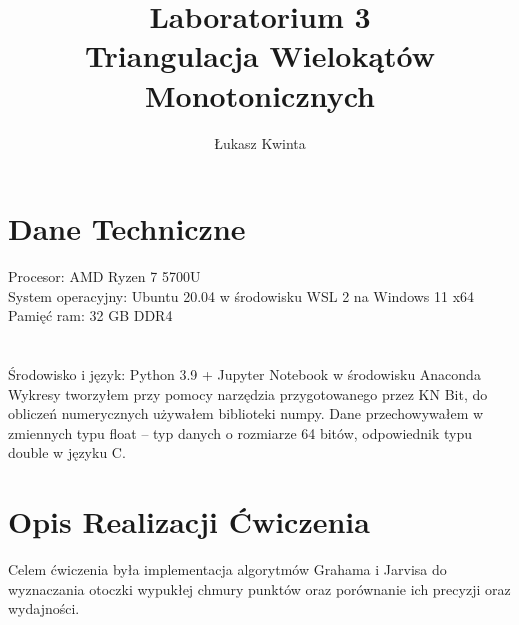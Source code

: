 \documentclass[a4paper]{article}
\title{\fontsize{30pt}{30pt}\selectfont Laboratorium 3 \\ Triangulacja Wielokątów Monotonicznych}
\author{\fontsize{20pt}{20pt}\selectfont Łukasz Kwinta}
\date{}
\begin{document}
\maketitle
\Large
\vspace*{\fill}
\section{Dane Techniczne}
Procesor: AMD Ryzen 7 5700U\\
System operacyjny: Ubuntu 20.04 w środowisku WSL 2 na Windows 11 x64\\
Pamięć ram: 32 GB DDR4\\
\\
\\
Środowisko i język: Python 3.9 + Jupyter Notebook w środowisku Anaconda\\
Wykresy tworzyłem przy pomocy narzędzia przygotowanego przez KN Bit, 
do obliczeń numerycznych używałem biblioteki numpy.
 Dane przechowywałem w zmiennych typu float – typ danych o rozmiarze 64 bitów, 
 odpowiednik typu double w języku C.
\pagebreak
\section{Opis Realizacji Ćwiczenia}
Celem ćwiczenia była implementacja algorytmów Grahama i Jarvisa do wyznaczania
otoczki wypukłej chmury punktów oraz porównanie ich precyzji oraz wydajności.
\end{document}
